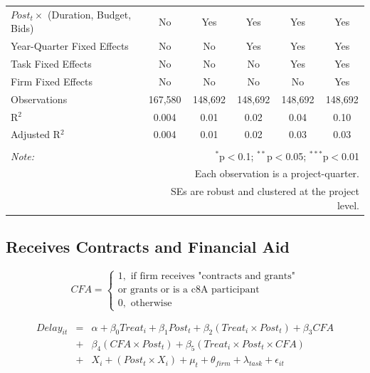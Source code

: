 \documentclass[
]{article}
\begin{document}
\begin{table}[H]
\begin{tabular}{@{\extracolsep{-2pt}}lccccc}
$Post_t \times $  (Duration, Budget, Bids) & No & Yes & Yes & Yes & Yes \\ 
Year-Quarter Fixed Effects & No & No & Yes & Yes & Yes \\ 
Task Fixed Effects & No & No & No & Yes & Yes \\ 
Firm Fixed Effects & No & No & No & No & Yes \\ 
Observations & 167,580 & 148,692 & 148,692 & 148,692 & 148,692 \\ 
R$^{2}$ & 0.004 & 0.01 & 0.02 & 0.04 & 0.10 \\ 
Adjusted R$^{2}$ & 0.004 & 0.01 & 0.02 & 0.03 & 0.03 \\ 
\hline 
\hline \\[-1.8ex] 
\textit{Note:}  & \multicolumn{5}{r}{$^{*}$p$<$0.1; $^{**}$p$<$0.05; $^{***}$p$<$0.01} \\ 
 & \multicolumn{5}{r}{Each observation is a project-quarter.} \\ 
 & \multicolumn{5}{r}{SEs are robust and clustered at the project level.} \\ 
\end{tabular} 
\end{table}

\hypertarget{receives-contracts-and-financial-aid}{%
\subsection{Receives Contracts and Financial
Aid}\label{receives-contracts-and-financial-aid}}

\[ CFA = \begin{cases} 1, \text{ if firm receives "contracts and grants"}\\ 
                       \text{or grants or is a c8A participant}\\
0, \text{ otherwise} \end{cases}\]

\[ \begin{aligned}
Delay_{it} &=& \alpha+\beta_0 Treat_i + \beta_1 Post_t + \beta_2 (Treat_i \times Post_t) +\beta_3 CFA \\
&+& \beta_4 (CFA \times Post_t) + \beta_5 (Treat_i \times Post_t \times CFA) \\ 
&+&X_i + (Post_t \times X_i) + \mu_t + \theta_{firm} + \lambda_{task}+ \epsilon_{it}
\end{aligned}\]
\end{document}
